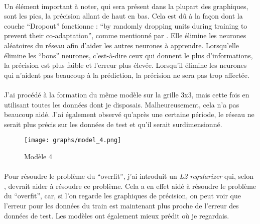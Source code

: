 \paragraph{}
Un élément important à noter, qui sera présent dans la plupart des graphiques, sont les pics, la précision allant de haut en bas.
Cela est dû à la façon dont la couche ``Dropout'' fonctionne : ``by randomly dropping units during training to prevent their co-adaptation'', comme mentionné par \cite{dropout_algorithm}.
Elle élimine les neurones aléatoires du réseau afin d'aider les autres neurones à apprendre.
Lorsqu'elle élimine les ``bons'' neurones, c'est-à-dire ceux qui donnent le plus d'informations, la précision est plus faible et l'erreur plus élevée.
Lorsqu'il élimine les neurones qui n'aident pas beaucoup à la prédiction, la précision ne sera pas trop affectée.

\paragraph{}
J'ai procédé à la formation du même modèle sur la grille 3x3, mais cette fois en utilisant toutes les données dont je disposais.
Malheureusement, cela n'a pas beaucoup aidé.
J'ai également observé qu'après une certaine période, le réseau ne serait plus précis sur les données de test et qu'il serait surdimensionné.


\begin{figure}[H]
    \centering
    \texttt{[image: graphs/model\_4.png]}
    \caption{Modèle 4}
\end{figure}

\paragraph{}
Pour résoudre le problème du ``overfit'', j'ai introduit un \emph{L2 regularizer} qui, selon \cite{l1_l2_regularisation}, devrait aider à résoudre ce problème.
Cela a en effet aidé à résoudre le problème du ``overfit'', car, si l'on regarde les graphiques de précision, on peut voir que l'erreur pour les données du train est maintenant plus proche de l'erreur des données de test. Les modèles ont également mieux prédit où je regardais.

